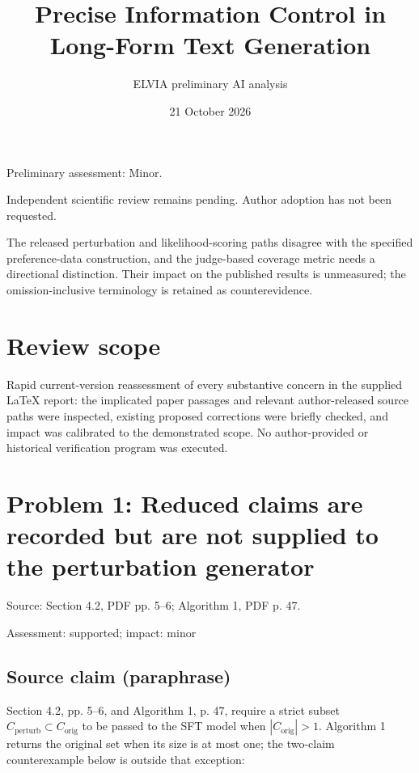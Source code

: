 \documentclass[11pt]{article}
\begin{document}
\title{Precise Information Control in Long-Form Text Generation}

\author{ELVIA preliminary AI analysis}\date{21 October 2026}\maketitle

Preliminary assessment: Minor.\par

Independent scientific review remains pending. Author adoption has not been requested.

The released perturbation and likelihood-scoring paths disagree with the specified preference-data construction, and the judge-based coverage metric needs a directional distinction. Their impact on the published results is unmeasured; the omission-inclusive terminology is retained as counterevidence.

\section*{Review scope}

Rapid current-version reassessment of every substantive concern in the supplied LaTeX report: the implicated paper passages and relevant author-released source paths were inspected, existing proposed corrections were briefly checked, and impact was calibrated to the demonstrated scope. No author-provided or historical verification program was executed.

\section*{Problem 1: Reduced claims are recorded but are not supplied to the perturbation generator}

Source: Section 4.2, PDF pp. 5–6; Algorithm 1, PDF p. 47.

Assessment: supported; impact: minor

\subsection*{Source claim (paraphrase)}

Section 4.2, pp. 5–6, and Algorithm 1, p. 47, require a strict subset \(C_{\mathrm{perturb}}\subset C_{\mathrm{orig}}\) to be passed to the SFT model when \(|C_{\mathrm{orig}}|>1\). Algorithm 1 returns the original set when its size is at most one; the two-claim counterexample below is outside that exception:
\end{document}

